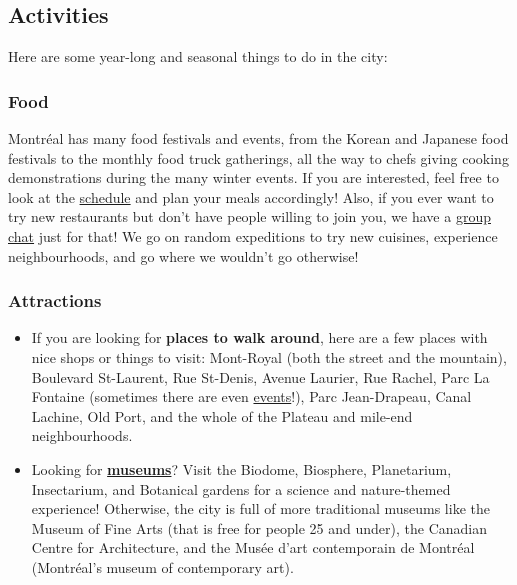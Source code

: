 \subsection{Activities}

Here are some year-long and seasonal things to do in the city:

\subsubsection{Food}
Montréal has many food festivals and events, from the Korean and Japanese food festivals to the monthly food truck gatherings, all the way to chefs giving cooking demonstrations during the many winter events. If you are interested, feel free to look at the \href{https://www.mtl.org/en/experience/guide-montreal-food-festivals}{schedule} and plan your meals accordingly! Also, if you ever want to try new restaurants but don't have people willing to join you, we have a \href{https://chat.whatsapp.com/H7Re6U6d7sQBbr9uv3EaJo?mode=gi_t}{group chat} just for that! We go on random expeditions to try new cuisines, experience neighbourhoods, and go where we wouldn't go otherwise!
\subsubsection{Attractions}
\begin{itemize}
    \item If you are looking for \textbf{places to walk around}, here are a few places with nice shops or things to visit: Mont-Royal (both the street and the mountain), Boulevard St-Laurent, Rue St-Denis, Avenue Laurier, Rue Rachel, Parc La Fontaine (sometimes there are even \href{https://montreal.ca/evenements?dc_relation.url=%2Flieux%2Ftheatre-de-verdure&orderBy=dc_temporal.start}{events}!), Parc Jean-Drapeau, Canal Lachine, Old Port, and the whole of the Plateau and mile-end neighbourhoods.
    \item Looking for \href{https://museesmontreal.org/en/museums}{\textbf{museums}}? Visit the Biodome, Biosphere, Planetarium, Insectarium, and Botanical gardens for a science and nature-themed experience! Otherwise, the city is full of more traditional museums like the Museum of Fine Arts (that is free for people 25 and under), the Canadian Centre for Architecture, and the Musée d'art contemporain de Montréal (Montréal's museum of contemporary art).
\end{itemize}

